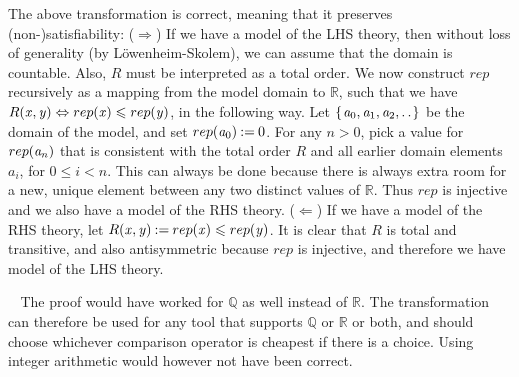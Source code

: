 \documentclass{article}
\newcommand{\Varid}[1]{\mathit{#1}}
\renewcommand{\leq}{\leqslant}
\renewcommand{\paragraph}[1]{\vspace{0.2cm}\noindent {\bf #1} $\;\;$}
\begin{document}
The above transformation is correct, meaning that it preserves (non-)satisfiability: ($\Rightarrow$) If we have a model of the LHS theory, then without loss of generality (by L{\"o}wenheim-Skolem), we can assume that the domain is countable. Also, \ensuremath{R} must be interpreted as a total order. We now construct \ensuremath{rep} recursively as a mapping from the model domain to \ensuremath{\mathbb{R}}, such that we have \ensuremath{R\hspace{-0.1cm}\;(\Varid{x},\Varid{y})\Leftrightarrow rep\hspace{-0.1cm}\;(\Varid{x})\leq rep\hspace{-0.1cm}\;(\Varid{y})}, in the following way. Let \ensuremath{\{\mskip1.5mu \Varid{a}_0,\Varid{a}_1,\Varid{a}_2,\mathinner{\ldotp\ldotp}\mskip1.5mu\}} be the domain of the model, and set \ensuremath{rep\hspace{-0.1cm}\;(\Varid{a}_0)\mathbin{:=}\mathrm{0}}. For any \ensuremath{\Varid{n}\mathbin{>}\mathrm{0}}, pick a value for \ensuremath{rep\hspace{-0.1cm}\;(\Varid{a}_n)} that is consistent with the total order \ensuremath{R} and all earlier domain elements \ensuremath{\Varid{a}_i}, for \ensuremath{\mathrm{0}\leq \Varid{i}\mathbin{<}\Varid{n}}. This can always be done because there is always extra room for a new, unique element between any two distinct values of \ensuremath{\mathbb{R}}. Thus \ensuremath{rep} is injective and we also have a model of the RHS theory. ($\Leftarrow$) If we have a model of the RHS theory, let \ensuremath{R\hspace{-0.1cm}\;(\Varid{x},\Varid{y})\mathbin{:=}rep\hspace{-0.1cm}\;(\Varid{x})\leq rep\hspace{-0.1cm}\;(\Varid{y})}. It is clear that \ensuremath{R} is total and transitive, and also antisymmetric because \ensuremath{rep} is injective, and therefore we have model of the LHS theory.

\paragraph{Note on \ensuremath{\mathbb{Q}} vs. \ensuremath{\mathbb{R}}} The proof would have worked for \ensuremath{\mathbb{Q}} as well instead of \ensuremath{\mathbb{R}}. The transformation can therefore be used for any tool that supports \ensuremath{\mathbb{Q}} or \ensuremath{\mathbb{R}} or both, and should choose whichever comparison operator is cheapest if there is a choice. Using integer arithmetic would however not have been correct.
\end{document}
